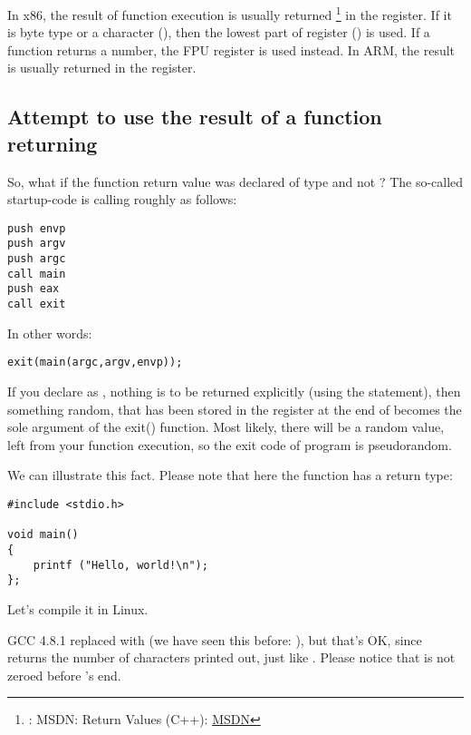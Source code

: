 

In x86, the result of function execution is usually returned
\footnote{\Seealso: MSDN: Return Values (C++): \href{http://go.yurichev.com/17258}{MSDN}}
in the \EAX register. 
If it is byte type or a character (\Tchar), then the lowest part of register \EAX (\AL) is used. 
If a function returns a \Tfloat number, the FPU register  is used instead.
In ARM, the result is usually returned in the  register.

\subsection{Attempt to use the result of a function returning \Tvoid}

So, what if the \main function return value was declared of type \Tvoid and not \Tint?
The so-called startup-code is calling \main roughly as follows:

\begin{lstlisting}[style=customasmx86]
push envp
push argv
push argc
call main
push eax
call exit
\end{lstlisting}

In other words:

\begin{lstlisting}[style=customc]
exit(main(argc,argv,envp));
\end{lstlisting}

If you declare \main as \Tvoid, nothing is to be returned explicitly (using the  statement),
then something random, that has been stored in the \EAX register at the end of \main becomes 
the sole argument of the exit() function.
Most likely, there will be a random value, left from your function execution, so the exit code of program is pseudorandom.
\par
We can illustrate this fact. 
Please note that here the \main function has a \Tvoid return type:

\begin{lstlisting}[style=customc]
#include <stdio.h>

void main()
{
	printf ("Hello, world!\n");
};
\end{lstlisting}

Let's compile it in Linux.

GCC 4.8.1 replaced \printf with \puts 
(we have seen this before: ), but that's OK,
since \puts returns the number of characters printed out, just like \printf.
Please notice that \EAX is not zeroed before \main's end.

